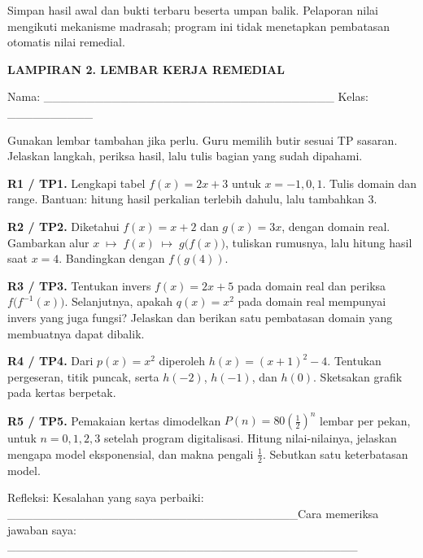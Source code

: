 \documentclass[11pt,a4paper]{article}
\begin{document}
{\small Simpan hasil awal dan bukti terbaru beserta umpan balik. Pelaporan nilai mengikuti mekanisme madrasah; program ini tidak menetapkan pembatasan otomatis nilai remedial.\par}\medskip
\clearpage
\begin{center}\bfseries\large LAMPIRAN 2. LEMBAR KERJA REMEDIAL\end{center}\medskip
{\small Nama: \_\_\_\_\_\_\_\_\_\_\_\_\_\_\_\_\_\_\_\_\_\_\_\_\_\_\_\_\_\_\_\_\_\_  Kelas: \_\_\_\_\_\_\_\_\_\_\par}\medskip
{\small Gunakan lembar tambahan jika perlu. Guru memilih butir sesuai TP sasaran. Jelaskan langkah, periksa hasil, lalu tulis bagian yang sudah dipahami.\par}\medskip
\noindent\textbf{R1 / TP1.} Lengkapi tabel \(f(x) = 2x + 3\) untuk \(x = -1, 0, 1\). Tulis domain dan range. Bantuan: hitung hasil perkalian terlebih dahulu, lalu tambahkan 3.\par\vspace{8mm}
\noindent\textbf{R2 / TP2.} Diketahui \(f(x) = x + 2\) dan \(g(x) = 3x\), dengan domain real. Gambarkan alur \(x\;\longmapsto\;f(x)\;\longmapsto\;g\bigl(f(x)\bigr)\), tuliskan rumusnya, lalu hitung hasil saat \(x = 4\). Bandingkan dengan \(f(g(4))\).\par\vspace{8mm}
\noindent\textbf{R3 / TP3.} Tentukan invers \(f(x) = 2x + 5\) pada domain real dan periksa \(f\bigl(f^{-1}(x)\bigr)\). Selanjutnya, apakah \(q(x) = x^2\) pada domain real mempunyai invers yang juga fungsi? Jelaskan dan berikan satu pembatasan domain yang membuatnya dapat dibalik.\par\vspace{9mm}
\noindent\textbf{R4 / TP4.} Dari \(p(x) = x^2\) diperoleh \(h(x) = (x + 1)^2 - 4\). Tentukan pergeseran, titik puncak, serta \(h(-2)\), \(h(-1)\), dan \(h(0)\). Sketsakan grafik pada kertas berpetak.\par\vspace{9mm}
\noindent\textbf{R5 / TP5.} Pemakaian kertas dimodelkan \(P(n)=80\left(\frac{1}{2}\right)^n\) lembar per pekan, untuk \(n = 0, 1, 2, 3\) setelah program digitalisasi. Hitung nilai-nilainya, jelaskan mengapa model eksponensial, dan makna pengali \(\frac{1}{2}\). Sebutkan satu keterbatasan model.\par\vspace{8mm}
{\small Refleksi: Kesalahan yang saya perbaiki: \_\_\_\_\_\_\_\_\_\_\_\_\_\_\_\_\_\_\_\_\_\_\_\_\_\_\_\_\_\_\_\_\_\_\newline Cara memeriksa jawaban saya: \_\_\_\_\_\_\_\_\_\_\_\_\_\_\_\_\_\_\_\_\_\_\_\_\_\_\_\_\_\_\_\_\_\_\_\_\_\_\_\_\_\par}\medskip
\end{document}
